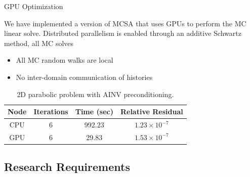 \documentclass{beamer}
\begin{document}
\begin{frame}{GPU Optimization}

  We have implemented a version of MCSA that uses GPUs to perform the MC
  linear solve.
  \vfill
  Distributed parallelism is enabled through an additive Schwartz method, all
  MC solves
  \begin{itemize}
  \item All MC random walks are local
  \item No inter-domain communication of histories
  \end{itemize}

  \begin{table}[h]
    \begin{center}
      \caption{2D parabolic problem with AINV preconditioning.}
      \begin{tabular}{|c|c|c|c|}\hline
        Node & Iterations & Time (sec) & Relative Residual \\\hline
        CPU & 6 & 992.23 & $1.23\times 10^{-7}$ \\\hline
        GPU & 6 & 29.83 & $1.53\times 10^{-7}$ \\\hline
      \end{tabular}
    \end{center}
  \end{table}

\end{frame}

\subsection{Research Requirements}
\end{document}
